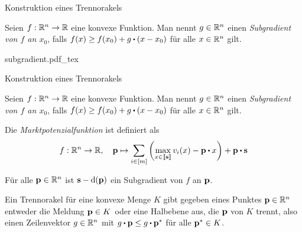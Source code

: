 \begin{frame}[t]{Konstruktion eines Trennorakels}
\pause\begin{definition}[Subgradient]
	Seien $f:\mathbb{R}^n \rightarrow \mathbb{R}$ eine konvexe Funktion.
	Man nennt $g\in\mathbb{R}^n$ einen \emph{Subgradient von $f$ an $x_0$}, falls $f(x)\geq f(x_0) + g \bcdot (x - x_0)$ für alle $x\in\mathbb{R}^n$ gilt.
\end{definition}
\def\svgwidth{\columnwidth}
	{subgradient.pdf_tex}
\end{frame}

\begin{frame}[t]{Konstruktion eines Trennorakels}
\addtocounter{theorem}{-1}
\vspace{0.2em}
\begin{definition}[Subgradient]
	Seien $f:\mathbb{R}^n \rightarrow \mathbb{R}$ eine konvexe Funktion.
	Man nennt $g\in\mathbb{R}^n$ einen \emph{Subgradient von $f$ an $x_0$}, falls $f(x)\geq f(x_0) + g \bcdot (x - x_0)$ für alle $x\in\mathbb{R}^n$ gilt.
\end{definition}
\vspace{-0.4em}
\begin{definition}[Marktpotenzialfunktion]
Die \emph{Marktpotenzialfunktion} ist definiert als
\[ f: \R^n \rightarrow \R, \quad \fp \mapsto \sum_{i\in\first{m}} \left( 
\max_{x\in\ffirst{\fs}} v_i(x) - \fp \bcdot x
\right) + \fp\bcdot \fs \]
\end{definition}
\vspace{-0.4em}
\pause \begin{lemma}
Für alle $\mathbf{p}\in\mathbb{R}^n$ ist $\mathbf{s} - \operatorname{d}(\mathbf{p})$ ein Subgradient von $f$ an $\mathbf{p}$.
\end{lemma}
\vspace{-0.4em}
\pause \begin{definition}[Trennorakel]
	Ein Trennorakel für eine konvexe Menge $K$ gibt gegeben eines Punktes $\mathbf{p}\in\mathbb{R}^n$ entweder die Meldung \glqq $\mathbf{p}\in K$\grqq\ oder eine Halbebene aus, die $\mathbf{p}$ von $K$ trennt, also einen Zeilenvektor $g\in\mathbb{R}^n$ mit $g\bcdot \fp \leq g \bcdot \fp^*$ für alle $\mathbf{p}^*\in K$.
\end{definition}
\end{frame}

